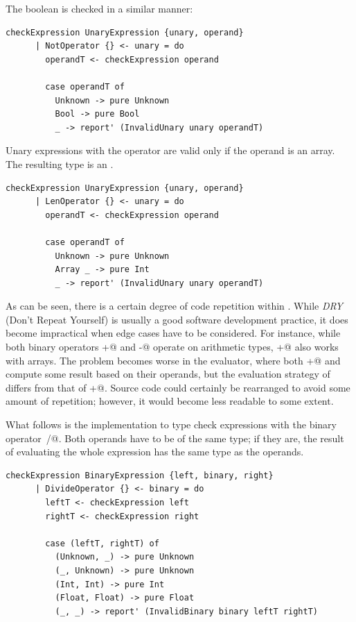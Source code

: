 \documentclass[UdineBachThesis,american,11pt,draft]{PhdThesis}
\begin{document}
  The boolean \lstinline@not@ is checked in a similar manner:

  \begin{lstlisting}[gobble=4,basicstyle=\ttfamily\small]
    checkExpression UnaryExpression {unary, operand}
      | NotOperator {} <- unary = do
        operandT <- checkExpression operand

        case operandT of
          Unknown -> pure Unknown
          Bool -> pure Bool
          _ -> report' (InvalidUnary unary operandT)
  \end{lstlisting}

  Unary expressions with the operator \lstinline@len@ are valid only if the
  operand is an array. The resulting type is an \lstinline@Int@.

  \begin{lstlisting}[gobble=4,basicstyle=\ttfamily\small]
    checkExpression UnaryExpression {unary, operand}
      | LenOperator {} <- unary = do
        operandT <- checkExpression operand

        case operandT of
          Unknown -> pure Unknown
          Array _ -> pure Int
          _ -> report' (InvalidUnary unary operandT)
  \end{lstlisting}

  As can be seen, there is a certain degree of code repetition within
  \lstinline@checkExpression@. While \emph{DRY} (Don't Repeat Yourself) is
  usually a good software development practice, it does become impractical when
  edge cases have to be considered. For instance, while both binary operators
  \lstinline@+@ and \lstinline@-@ operate on arithmetic types, \lstinline@+@
  also works with arrays. The problem becomes worse in the evaluator, where both
  \lstinline@+@ and \lstinline@and@ compute some result based on their operands,
  but the evaluation strategy of \lstinline@and@ differs from that of
  \lstinline@+@. Source code could certainly be rearranged to avoid some amount
  of repetition; however, it would become less readable to some extent.

  What follows is the implementation to type check expressions with the binary
  operator~\lstinline@/@. Both operands have to be of the same type; if they
  are, the result of evaluating the whole expression has the same type as the
  operands.

  \begin{lstlisting}[gobble=4,basicstyle=\ttfamily\small]
    checkExpression BinaryExpression {left, binary, right}
      | DivideOperator {} <- binary = do
        leftT <- checkExpression left
        rightT <- checkExpression right

        case (leftT, rightT) of
          (Unknown, _) -> pure Unknown
          (_, Unknown) -> pure Unknown
          (Int, Int) -> pure Int
          (Float, Float) -> pure Float
          (_, _) -> report' (InvalidBinary binary leftT rightT)
  \end{lstlisting}
\end{document}

